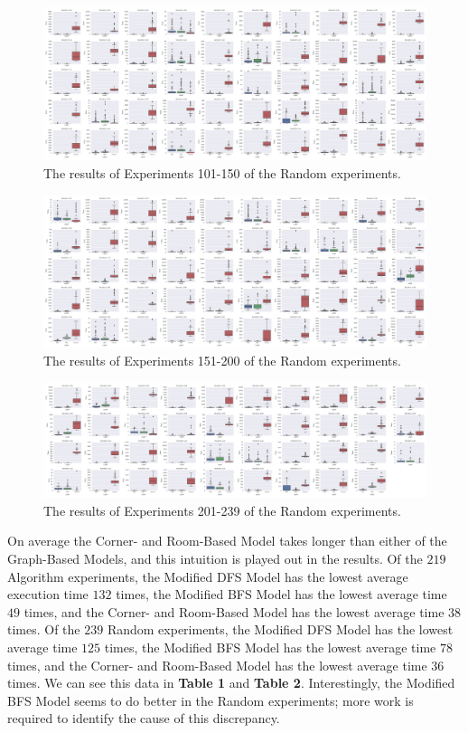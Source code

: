 \documentclass[12pt]{article}
\begin{document}
\begin{figure}[htbp]
\includegraphics[width=1\linewidth]{Random100-149.png} 
\caption{The results of Experiments 101-150 of the Random experiments.}
\end{figure} 

\begin{figure}[htbp]
\includegraphics[width=1\linewidth]{Random150-199.png} 
\caption{The results of Experiments 151-200 of the Random experiments.}
\end{figure} 

\begin{figure}[htbp]
\includegraphics[width=1\linewidth]{Random200-238.png} 
\caption{The results of Experiments 201-239 of the Random experiments.}
\end{figure} 

On average the Corner- and Room-Based Model takes longer than either of the Graph-Based Models, and this intuition is played out in the results. Of the $ 219 $ Algorithm experiments, the Modified DFS Model has the lowest average execution time $ 132 $ times, the Modified BFS Model has the lowest average time $ 49 $ times, and the Corner- and Room-Based Model has the lowest average time $ 38 $ times. Of the $ 239 $ Random experiments, the Modified DFS Model has the lowest average time $ 125 $ times, the Modified BFS Model has the lowest average time $ 78 $ times, and the Corner- and Room-Based Model has the lowest average time $ 36 $ times. We can see this data in \textbf{Table 1} and \textbf{Table 2}. Interestingly, the Modified BFS Model seems to do better in the Random experiments; more work is required to identify the cause of this discrepancy. 
\end{document}
